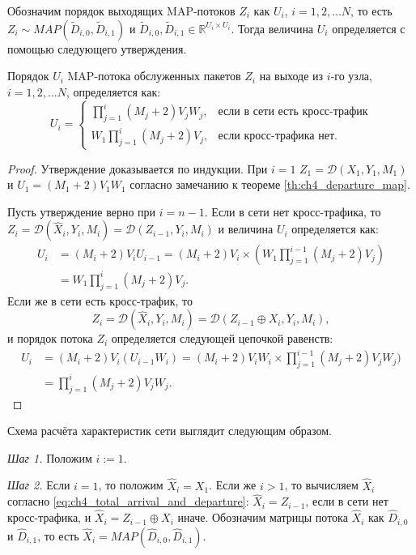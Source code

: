 Обозначим порядок выходящих MAP-потоков $Z_i$ как $U_i$, $i=1,2,\dots N$, то есть $Z_i \sim MAP(\tilde{D}_{i,0}, \tilde{D}_{i,1})$ и $\tilde{D}_{i,0}, \tilde{D}_{i,1} \in \mathbb{R}^{U_i \times U_i}$. Тогда величина $U_i$ определяется с помощью следующего утверждения.

\begin{prop}\label{prop:ch4_departure_order}
	Порядок $U_i$ MAP-потока обслуженных пакетов $Z_i$ на выходе из $i$-го узла, $i = 1,2,\dots N$, определяется как:
	$$
	U_i = \begin{cases}
		\prod\limits_{j=1}^{i}(M_j + 2)V_jW_j,&\text{если в сети есть кросс-трафик}\\
		W_1\prod\limits_{j=1}^{i}(M_j + 2)V_j,&\text{если кросс-трафика нет}.
	\end{cases}
	$$
\end{prop}
\begin{proof}
Утверждение доказывается по индукции. При $i = 1$ $Z_1 = \mathcal{D}(X_1, Y_1, M_1)$ и $U_1 = (M_1 + 2)V_1W_1$ согласно замечанию к теореме \ref{th:ch4_departure_map}.

Пусть утверждение верно при $i = n-1$. Если в сети нет кросс-трафика, то $Z_i = \mathcal{D}(\hat{X}_i, Y_i, M_i) = \mathcal{D}(Z_{i-1}, Y_i, M_i)$ и величина $U_i$ определяется как:
$$
  \begin{aligned}
    U_i &= (M_i + 2) V_i U_{i-1} = (M_i + 2) V_i \times (W_1 \prod\limits_{j=1}^{i-1}(M_j + 2)V_j)\\
    &= W_1 \prod\limits_{j=1}^{i}(M_j + 2)V_j.
  \end{aligned}
$$
Если же в сети есть кросс-трафик, то
$$
  Z_i = \mathcal{D}(\hat{X}_i, Y_i, M_i) = \mathcal{D}(Z_{i-1} \oplus X_i, Y_i, M_i),
$$
и порядок потока $Z_i$ определяется следующей цепочкой равенств:
$$
  \begin{aligned}
    U_i &= (M_i + 2) V_i (U_{i-1} W_i) = (M_i + 2) V_i W_i \times \prod\limits_{j=1}^{i-1}(M_j + 2) V_j W_j)\\
    &= \prod\limits_{j=1}^{i}(M_j + 2) V_j W_j.
  \end{aligned}
$$
\end{proof}

Схема расчёта характеристик сети выглядит следующим образом.

\textit{Шаг 1.} Положим $i := 1$.

\textit{Шаг 2.} Если $i = 1$, то положим $\hat{X}_i = X_1$. Если же $i > 1$, то вычисляем $\hat{X}_i$ согласно \eqref{eq:ch4_total_arrival_and_departure}: $\hat{X}_i = Z_{i-1}$, если в сети нет кросс-трафика, и $\hat{X}_i = Z_{i-1} \oplus X_i$ иначе. Обозначим матрицы потока $\hat{X}_i$ как $\hat{D}_{i,0}$ и $\hat{D}_{i,1}$, то есть $\hat{X}_i = MAP(\hat{D}_{i,0}, \hat{D}_{i,1})$.

